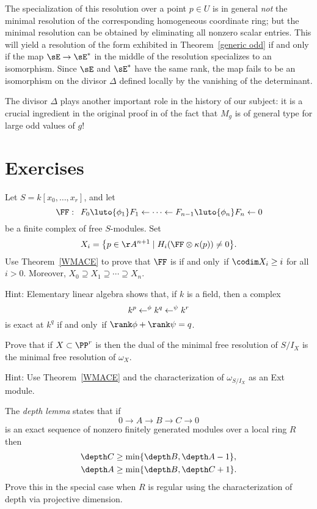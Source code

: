 The specialization of this resolution over a point $p\in U$
is in general \emph{not} the minimal resolution of the corresponding
homogeneous coordinate ring; but the
minimal resolution can be obtained by eliminating all nonzero scalar entries.
This will yield a resolution of the form exhibited in Theorem~\ref{generic odd}
if and only if the  map $\sE \to \sE^{*}$ in the middle of the resolution
specializes to an isomorphism. Since $\sE$ and $\sE^{*}$ have the same
rank, the map fails to be an isomorphism on the divisor $\Delta$ defined locally
by the vanishing of the determinant.

The divisor $\Delta$ plays another important role
in the history of our subject: it is a crucial ingredient in the original proof in
\cite{***} of the fact that $M_{g}$ is of general type for large odd values of $g$!

\section{Exercises}

\begin{exercise}\label{WMACE corollary}
Let $S = k[x_0,\dots, x_r]$, and let
$$
\FF:\quad  
F_0\luto{\phi_1}F_1 \leftarrow \cdots \leftarrow F_{n-1}\luto{\phi_n} F_n\leftarrow 0
$$
be a finite complex of free $S$-modules. Set
$$
X_i =\big\{p\in \AA^{n+1} \mid  H_i(\FF \otimes \kappa(p)) \neq 0 \big\}.
$$
Use Theorem~\ref{WMACE} to prove that $\FF$ is 
%
if and only~if
$
\codim X_i \geq i
$
for all $i>0$. Moreover, $X_{0}\supseteq X_{1}\supseteq \cdots \supseteq
X_{n}$.

Hint: Elementary linear algebra shows that, if $k$ is a field, then a
complex $$k^p \lTo^{\phi} k^q \lTo^\psi k^r$$ is exact at $k^q$ if and
only~if $\rank \phi +\rank \psi = q$.
\end{exercise}

\begin{exercise}
Prove that if $X\subset \PP^r$ is 
%
then
the dual of the minimal free resolution of $S/I_X$
is the minimal free resolution of $\omega_X$.

Hint: Use Theorem~\ref{WMACE}
and the characterization of $\omega_{S/I_X}$
as an Ext module.
\end{exercise}

\begin{exercise}
The \emph{depth lemma} states that if
%
$$
0\to A\to B\to C \to 0
$$
is an exact sequence of nonzero finitely generated modules over a local
ring $R$ then
$$
\begin{aligned}
\depth C &\geq \min\{\depth B, \depth A-1\},\\
\depth A & \geq \min\{\depth B, \depth C +1\}.
\end{aligned}
$$
Prove this in the special case when $R$ is regular using the
characterization of depth
via projective dimension.
\end{exercise}

